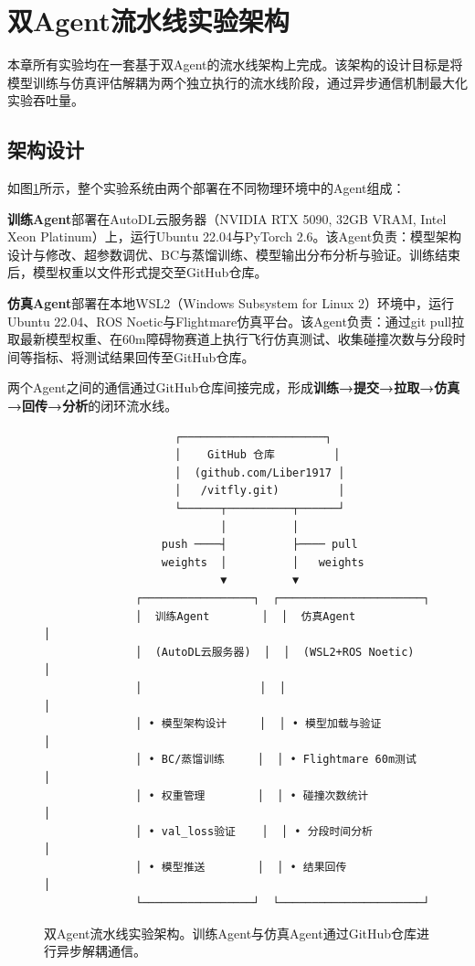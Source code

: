 
\section{双Agent流水线实验架构}

本章所有实验均在一套基于双Agent的流水线架构上完成。该架构的设计目标是将模型训练与仿真评估解耦为两个独立执行的流水线阶段，通过异步通信机制最大化实验吞吐量。

\subsection{架构设计}

如图\ref{fig:pipeline}所示，整个实验系统由两个部署在不同物理环境中的Agent组成：

\textbf{训练Agent}部署在AutoDL云服务器（NVIDIA RTX 5090, 32GB VRAM, Intel Xeon Platinum）上，运行Ubuntu 22.04与PyTorch 2.6。该Agent负责：模型架构设计与修改、超参数调优、BC与蒸馏训练、模型输出分布分析与验证。训练结束后，模型权重以文件形式提交至GitHub仓库。

\textbf{仿真Agent}部署在本地WSL2（Windows Subsystem for Linux 2）环境中，运行Ubuntu 22.04、ROS Noetic与Flightmare仿真平台\cite{shah2017flightmare}。该Agent负责：通过git pull拉取最新模型权重、在60m障碍物赛道上执行飞行仿真测试、收集碰撞次数与分段时间等指标、将测试结果回传至GitHub仓库。

两个Agent之间的通信通过GitHub仓库间接完成，形成\textbf{训练→提交→拉取→仿真→回传→分析}的闭环流水线。

\begin{figure}[t]
\centering
\begin{verbatim}
                    ┌──────────────────────┐
                    │    GitHub 仓库         │
                    │  (github.com/Liber1917 │
                    │   /vitfly.git)         │
                    └──────┬──────────┬──────┘
                           │          │
                  push ────┤          ├──── pull
                  weights  │          │   weights
                           ▼          ▼
              ┌─────────────────┐  ┌──────────────────────┐
              │  训练Agent        │  │  仿真Agent            │
              │  (AutoDL云服务器)  │  │  (WSL2+ROS Noetic)    │
              │                  │  │                       │
              │ • 模型架构设计     │  │ • 模型加载与验证       │
              │ • BC/蒸馏训练     │  │ • Flightmare 60m测试   │
              │ • 权重管理        │  │ • 碰撞次数统计         │
              │ • val_loss验证    │  │ • 分段时间分析         │
              │ • 模型推送        │  │ • 结果回传            │
              └─────────────────┘  └──────────────────────┘
\end{verbatim}
\caption{双Agent流水线实验架构。训练Agent与仿真Agent通过GitHub仓库进行异步解耦通信。}
\label{fig:pipeline}
\end{figure}


